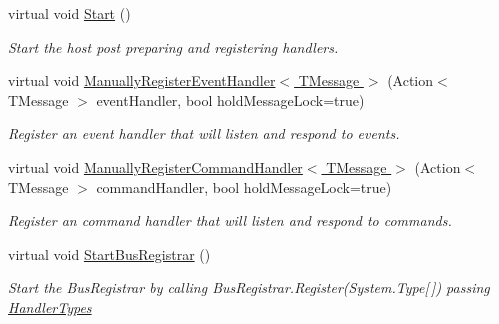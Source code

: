 \begin{DoxyCompactItemize}
virtual void \hyperlink{classCqrs_1_1Hosts_1_1CoreHost_ad8abd7b3c7f6970e106ba42c2745beda_ad8abd7b3c7f6970e106ba42c2745beda}{Start} ()
\begin{DoxyCompactList}\small\item\em Start the host post preparing and registering handlers. \end{DoxyCompactList}\item 
virtual void \hyperlink{classCqrs_1_1Hosts_1_1CoreHost_afd0a6b149a8b5ce0e9be016f422f06f9_afd0a6b149a8b5ce0e9be016f422f06f9}{Manually\+Register\+Event\+Handler$<$ T\+Message $>$} (Action$<$ T\+Message $>$ event\+Handler, bool hold\+Message\+Lock=true)
\begin{DoxyCompactList}\small\item\em Register an event handler that will listen and respond to events. \end{DoxyCompactList}\item 
virtual void \hyperlink{classCqrs_1_1Hosts_1_1CoreHost_a834781c47df7220f4b62a90d0333ab18_a834781c47df7220f4b62a90d0333ab18}{Manually\+Register\+Command\+Handler$<$ T\+Message $>$} (Action$<$ T\+Message $>$ command\+Handler, bool hold\+Message\+Lock=true)
\begin{DoxyCompactList}\small\item\em Register an command handler that will listen and respond to commands. \end{DoxyCompactList}\item 
virtual void \hyperlink{classCqrs_1_1Hosts_1_1CoreHost_af743bda749d5b95aecb4ee4a4e2a263f_af743bda749d5b95aecb4ee4a4e2a263f}{Start\+Bus\+Registrar} ()
\begin{DoxyCompactList}\small\item\em Start the Bus\+Registrar by calling Bus\+Registrar.\+Register(\+System.\+Type\mbox{[}$\,$\mbox{]}) passing \hyperlink{classCqrs_1_1Hosts_1_1CoreHost_a7bfb4acd3b84a95d341b57cc28388023_a7bfb4acd3b84a95d341b57cc28388023}{Handler\+Types} \end{DoxyCompactList}\end{DoxyCompactItemize}

